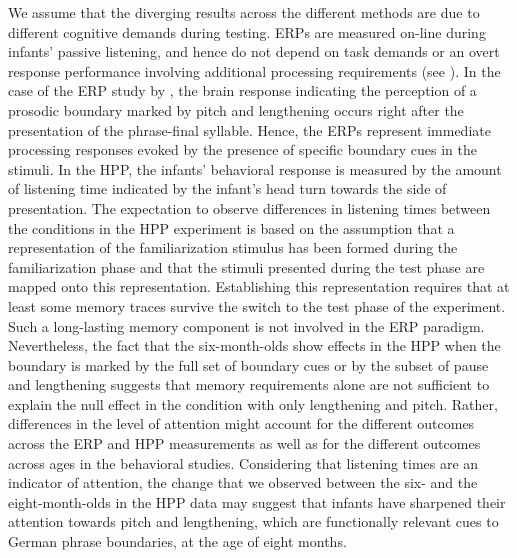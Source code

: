 \documentclass[output=paper]{langscibook}
\begin{document}
We assume that the diverging results across the different methods are due to different cognitive demands during testing. ERPs are measured on-line during infants’ passive listening, and hence do not depend on task demands or an overt response performance involving additional processing requirements (see \citealt{Mannel2008}). In the case of the ERP study by \citet{Holzgrefe-Lang2018}, the brain response indicating the perception of a prosodic boundary marked by pitch and lengthening occurs right after the presentation of the phrase-final syllable. Hence, the ERPs represent immediate processing responses evoked by the presence of specific boundary cues in the stimuli. In the HPP, the infants’ behavioral response is measured by the amount of listening time indicated by the infant’s head turn towards the side of presentation. The expectation to observe differences in listening times between the conditions in the HPP experiment is based on the assumption that a representation of the familiarization stimulus has been formed during the familiarization phase and that the stimuli presented during the test phase are mapped onto this representation. Establishing this representation requires that at least some memory traces survive the switch to the test phase of the experiment. Such a long-lasting memory component is not involved in the ERP paradigm. Nevertheless, the fact that the six-month-olds show effects in the HPP when the boundary is marked by the full set of boundary cues or by the subset of pause and lengthening suggests that memory requirements alone are not sufficient to explain the null effect in the condition with only lengthening and pitch. Rather, differences in the level of attention might account for the different outcomes across the ERP and HPP measurements as well as for the different outcomes across ages in the behavioral studies. Considering that listening times are an indicator of attention, the change that we observed between the six- and the eight-month-olds in the HPP data may suggest that infants have sharpened their attention towards pitch and lengthening, which are functionally relevant cues to German phrase boundaries, at the age of eight months.

\end{document}
